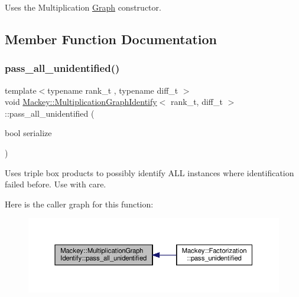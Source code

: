 Uses the Multiplication \hyperlink{classMackey_1_1Graph}{Graph} constructor. 



\subsection{Member Function Documentation}
\mbox{\label{classMackey_1_1MultiplicationGraphIdentify_a0474299a4f315e6e58c8ad8dd0a66fb5}} 
\subsubsection{\texorpdfstring{pass\+\_\+all\+\_\+unidentified()}{pass\_all\_unidentified()}}
{\footnotesize\ttfamily template$<$typename rank\+\_\+t , typename diff\+\_\+t $>$ \\
void \hyperlink{classMackey_1_1MultiplicationGraphIdentify}{Mackey\+::\+Multiplication\+Graph\+Identify}$<$ rank\+\_\+t, diff\+\_\+t $>$\+::pass\+\_\+all\+\_\+unidentified (\begin{DoxyParamCaption}\item[{bool}]{serialize }\end{DoxyParamCaption})\hspace{0.3cm}{\ttfamily [protected]}}



Uses triple box products to possibly identify A\+LL instances where identification failed before. Use with care. 

Here is the caller graph for this function\+:\nopagebreak
\begin{figure}[H]
\begin{center}
\leavevmode
\includegraphics[width=350pt]{classMackey_1_1MultiplicationGraphIdentify_a0474299a4f315e6e58c8ad8dd0a66fb5_icgraph}
\end{center}
\end{figure}
\mbox{\label{classMackey_1_1MultiplicationGraphIdentify_a5c945ebff968abe788e22b025b2455ed}} 
